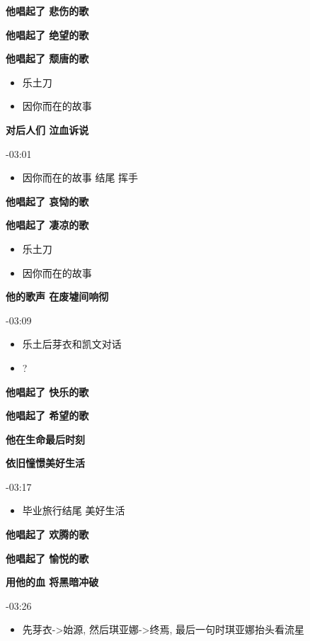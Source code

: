 \documentclass[a4paper]{article}
\begin{document}
\textbf{他唱起了 悲伤的歌}

\textbf{他唱起了 绝望的歌}

\textbf{他唱起了 颓唐的歌}

\begin{itemize}
    \item 乐土刀
    \item 因你而在的故事
\end{itemize}

\textbf{对后人们 泣血诉说}

-03:01

\begin{itemize}
    \item 因你而在的故事 结尾 挥手
\end{itemize}

\textbf{他唱起了 哀恸的歌}

\textbf{他唱起了 凄凉的歌}

\begin{itemize}
    \item 乐土刀
    \item 因你而在的故事
\end{itemize}

\textbf{他的歌声 在废墟间响彻}

-03:09

\begin{itemize}
    \item 乐土后芽衣和凯文对话
    \item ?
\end{itemize}

\textbf{他唱起了 快乐的歌}

\textbf{他唱起了 希望的歌}

\textbf{他在生命最后时刻}

\textbf{依旧憧憬美好生活}

-03:17

\begin{itemize}
    \item 毕业旅行结尾 美好生活
\end{itemize}

\textbf{他唱起了 欢腾的歌}

\textbf{他唱起了 愉悦的歌}

\textbf{用他的血 将黑暗冲破}

-03:26

\begin{itemize}
    \item 先芽衣->始源, 然后琪亚娜->终焉, 最后一句时琪亚娜抬头看流星
\end{itemize}
\end{document}
